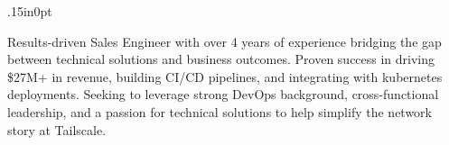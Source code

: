 \documentclass[letterpaper,11pt]{article}
\begin{document}
            \begin{adjustwidth}{.15in}{0pt}

            



            Results-driven Sales Engineer with over 4 years of experience bridging
            the gap between technical solutions and business outcomes. Proven
            success in driving \$27M+ in revenue, building CI/CD pipelines, and 
            integrating with kubernetes deployments. Seeking to leverage strong
            DevOps background, cross-functional leadership, and a passion for
            technical solutions to help simplify the network story at Tailscale.

            \end{adjustwidth}
\end{document}
